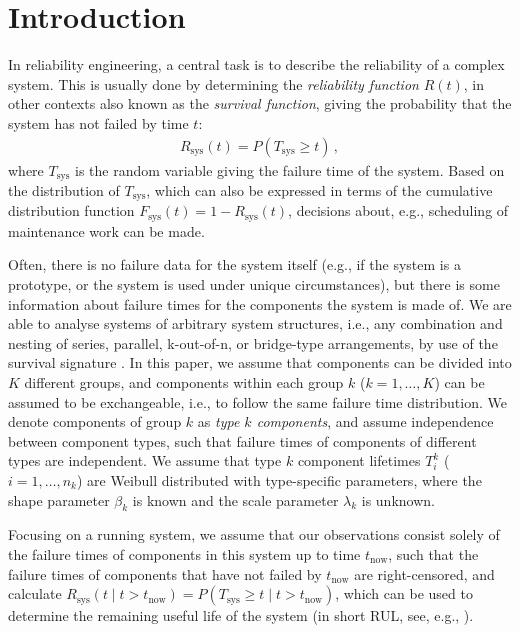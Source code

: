 \documentclass[Journal,SectionNumbers,SingleSpace,InsideFigs]{ascelike}
\newcommand{\Rsys}{R_\text{sys}}
\def\Rsys{R_\text{sys}}
\def\Tsys{T_\text{sys}}
\def\tnow{t_\text{now}}
\begin{document}


\section{Introduction}

In reliability engineering, a central task is to describe the reliability of a complex system.
This is usually done by determining the \emph{reliability function} $R(t)$,
in other contexts also known as the \emph{survival function},
giving the probability that the system has not failed by time $t$:
\begin{align}
\Rsys(t) = P(\Tsys \geq t)\,,
\end{align}
where $\Tsys$ is the random variable giving the failure time of the system. %
Based on the distribution of $\Tsys$, which can also be expressed
in terms of the cumulative distribution function $F_\text{sys}(t) = 1 - \Rsys(t)$,
decisions about, e.g., scheduling of maintenance work can be made.

Often, there is no failure data for the system itself
(e.g., if the system is a prototype, or the system is used under unique circumstances),
but there is some information about failure times for the components the system is made of.
We are able to analyse systems of arbitrary system structures, %
i.e., any combination and nesting of series, parallel, k-out-of-n, or bridge-type arrangements,
by use of the survival signature \cite{2012:survsign}.
In this paper, we assume that components can be divided into $K$ different groups,
and components within each group $k$ ($k=1, \ldots, K$) can be assumed to be exchangeable,
i.e., to follow the same failure time distribution.
We denote components of group $k$ as \emph{type $k$ components},
and assume independence between component types,
such that failure times of components of different types are independent.
We assume that type $k$ component lifetimes $T_i^k$ ($i = 1, \ldots, n_k$)
are Weibull distributed with type-specific parameters,
where the shape parameter $\beta_k$ is known
and the scale parameter $\lambda_k$ is unknown.

Focusing on a running system,
we assume that our observations consist solely of the failure times of components in this system up to time $\tnow$,
such that the failure times of components that have not failed by $\tnow$ are right-censored,
and calculate $\Rsys(t \mid t > \tnow) = P(\Tsys \geq t \mid t > \tnow)$,
which can be used to determine the remaining useful life of the system
(in short RUL, see, e.g., ).
\end{document}
